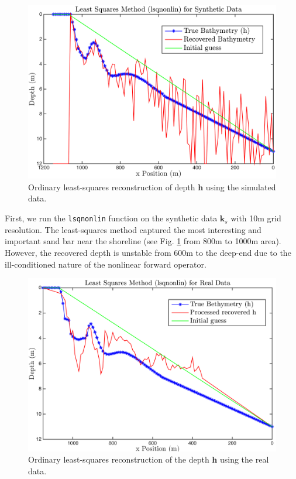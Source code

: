 \begin{figure}[H]
\center
\includegraphics[scale=0.6]{img/lsqnonlin_simulated_10m.png} %
\caption{Ordinary least-squares reconstruction of depth $\mathbf{h}$ using the simulated data.}
\label{lsqnonlin_simulated}
\end{figure}
First, we run the \verb|lsqnonlin| function on the synthetic data $\mathbf{k}_s$ with 10m grid resolution. The least-squares method captured the most interesting and important sand bar near the shoreline (see Fig. \ref{lsqnonlin_simulated} from 800m to 1000m area). However, the recovered depth is unstable from 600m to the deep-end due to the ill-conditioned nature of the nonlinear forward operator. 

\begin{figure}[H]
\center
\includegraphics[scale=0.6]{img/lsqnonlin_real_data_oct09.png} %
\caption{Ordinary least-squares reconstruction of the depth $\mathbf{h}$ using the real data.}
\label{lsqnonlin_real}
\end{figure}

